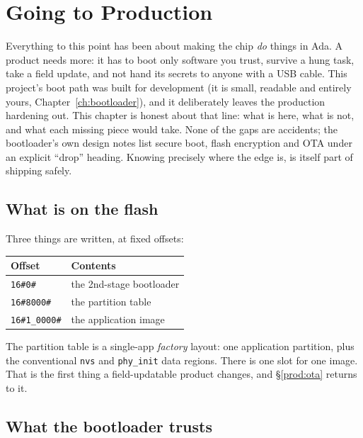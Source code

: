 \chapter{Going to Production}
\label{ch:production}

Everything to this point has been about making the chip \emph{do} things in Ada. A
product needs more: it has to boot only software you trust, survive a hung task,
take a field update, and not hand its secrets to anyone with a USB cable. This
project's boot path was built for development (it is small, readable and entirely
yours, Chapter~\ref{ch:bootloader}), and it deliberately leaves the production
hardening out. This chapter is honest about that line: what is here, what is not,
and what each missing piece would take. None of the gaps are accidents; the
bootloader's own design notes list secure boot, flash encryption and OTA under an
explicit ``drop'' heading. Knowing precisely where the edge is, is itself part of
shipping safely.

\section{What is on the flash}

Three things are written, at fixed offsets:

\begin{center}
\begin{tabular}{l l}
\toprule
\textbf{Offset} & \textbf{Contents} \\ \midrule
\texttt{16\#0\#}       & the 2nd-stage bootloader \\
\texttt{16\#8000\#}    & the partition table \\
\texttt{16\#1\_0000\#} & the application image \\
\bottomrule
\end{tabular}
\end{center}

The partition table is a single-app \emph{factory} layout: one application
partition, plus the conventional \texttt{nvs} and \texttt{phy\_init} data regions.
There is one slot for one image. That is the first thing a field-updatable product
changes, and \S\ref{prod:ota} returns to it.

\section{What the bootloader trusts}

